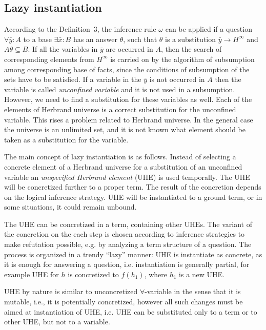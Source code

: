 \documentclass[runningheads,a4paper]{llncs}
\begin{document}
\subsection{Lazy instantiation}

According to the Definition~3, the inference rule $\omega$ can be applied if a question $\forall \bar{y}\colon A$ to a base $\exists \bar{x}\colon B$ has an answer $\theta$, such that $\theta$ is a substitution $\bar{y} \rightarrow H^{\infty}$ and $A\theta \subseteq B$. If all the variables in $\bar{y}$ are occurred in $A$, then the search of corresponding elements from $H^{\infty}$ is carried on by the algorithm of subsumption among corresponding base of facts, since the conditions of subsumption of the sets have to be satisfied. If a variable in the $\bar{y}$ is not occurred in $A$ then the variable is called \emph{unconfined variable} and it is not used in a subsumption. However, we need to find a substitution for these variables as well.  Each of the elements of Herbrand universe is a correct substitution for the unconfined variable. This rises a problem related to Herbrand universe. In the general case the universe is an unlimited set, and it is not known what element should be taken as a substitution for the variable.

The main concept of lazy instantiation is as follows. Instead of selecting a concrete element of a Herbrand universe for a substitution of an unconfined variable an {\em unspecified Herbrand element} (UHE) is used temporally. The UHE will be concretized further to a proper term. The result of the concretion depends on the logical inference strategy. UHE will be instantiated to a ground term, or in some situations, it could remain unbound.

The UHE can be concretized in a term, containing other UHEs. The variant of the concretion on the each step is chosen according to inference strategies to make refutation possible, e.g. by analyzing a term structure of a question.  The process is organized in a trendy ``lazy'' manner: UHE is instantiate as concrete, as it is enough for answering a question, i.e. instantiation is generally partial, for example UHE for $h$ is concretized to $f(h_1)$, where $h_1$ is a new UHE.

UHE by nature is similar to unconcretized $\forall$-variable in the sense that it is mutable, i.e., it is potentially concretized, however all such changes must be aimed at instantiation of  UHE, i.e. UHE can be substituted only to a term or to other UHE, but not to a variable.
\end{document}
